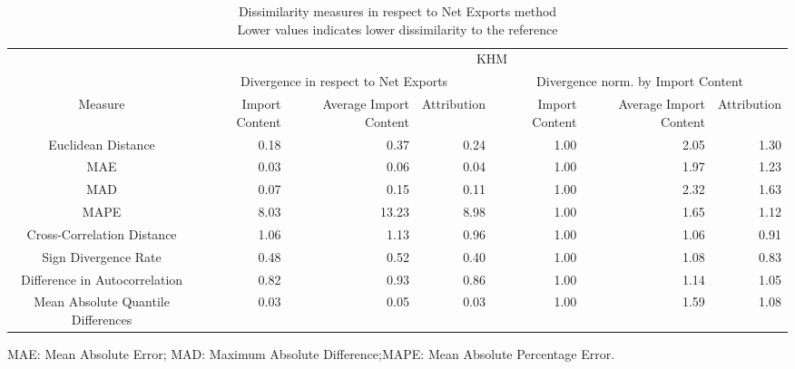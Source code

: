 \begin{table}[t]
\caption*{
{\large Dissimilarity measures in respect to Net Exports method} \\ 
{\small Lower values indicates lower dissimilarity to the reference}
} 
\fontsize{15.0pt}{18.0pt}\selectfont
\begin{tabular*}{\linewidth}{@{\extracolsep{\fill}}crrrrrr}
\toprule
 & \multicolumn{6}{c}{KHM} \\ 
\cmidrule(lr){2-7}
 & \multicolumn{3}{c}{Divergence in respect to Net Exports} & \multicolumn{3}{c}{Divergence norm. by Import Content} \\ 
\cmidrule(lr){2-4} \cmidrule(lr){5-7}
Measure & Import Content & Average Import Content & Attribution & Import Content & Average Import Content & Attribution \\ 
\midrule\addlinespace[2.5pt]
Euclidean Distance & 0.18 & 0.37 & 0.24 & 1.00 & 2.05 & 1.30 \\ 
MAE & 0.03 & 0.06 & 0.04 & 1.00 & 1.97 & 1.23 \\ 
MAD & 0.07 & 0.15 & 0.11 & 1.00 & 2.32 & 1.63 \\ 
MAPE & 8.03 & 13.23 & 8.98 & 1.00 & 1.65 & 1.12 \\ 
Cross-Correlation Distance & 1.06 & 1.13 & 0.96 & 1.00 & 1.06 & 0.91 \\ 
Sign Divergence Rate & 0.48 & 0.52 & 0.40 & 1.00 & 1.08 & 0.83 \\ 
Difference in Autocorrelation & 0.82 & 0.93 & 0.86 & 1.00 & 1.14 & 1.05 \\ 
Mean Absolute Quantile Differences & 0.03 & 0.05 & 0.03 & 1.00 & 1.59 & 1.08 \\ 
\bottomrule
\end{tabular*}
\begin{minipage}{\linewidth}
MAE: Mean Absolute Error; MAD: Maximum Absolute Difference;MAPE: Mean Absolute Percentage Error.\\
\end{minipage}
\end{table}

